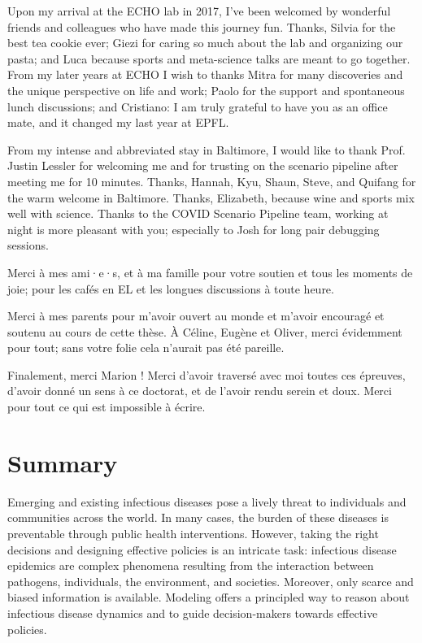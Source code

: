  Upon my arrival at the ECHO lab in 2017, I've been welcomed by wonderful friends and colleagues who have made this journey fun. Thanks, Silvia for the best tea cookie ever; Giezi for caring so much about the lab and organizing our pasta; and Luca because sports and meta-science talks are meant to go together. From my later years at ECHO I wish to thanks Mitra for many discoveries and the unique perspective on life and work; Paolo for the support and spontaneous lunch discussions; and Cristiano: I am truly grateful to have you as an office mate, and it changed my last year at EPFL.
 
  From my intense and abbreviated stay in Baltimore, I would like to thank Prof. Justin Lessler for welcoming me and for trusting on the scenario pipeline after meeting me for 10 minutes. Thanks, Hannah, Kyu, Shaun, Steve, and Quifang for the warm welcome in Baltimore. Thanks, Elizabeth, because wine and sports mix well with science. Thanks to the COVID Scenario Pipeline team, working at night is more pleasant with you; especially to Josh for long pair debugging sessions.
 
 Merci à mes ami·e·s, et à ma famille pour votre soutien et tous les moments de joie; pour les cafés en EL et les longues discussions à toute heure.

Merci à mes parents pour m'avoir ouvert au monde et m'avoir encouragé et soutenu au cours de cette thèse.
À Céline, Eugène et Oliver, merci évidemment pour tout; sans votre folie cela n'aurait pas été pareille.

Finalement, merci Marion ! Merci d'avoir traversé avec moi toutes ces épreuves, d'avoir donné un sens à ce doctorat, et de l'avoir rendu  serein et doux. Merci pour tout ce qui est impossible à écrire.

 
 \chapter*{Summary} %
\vspace{-.5cm}
Emerging and existing infectious diseases pose a lively threat to individuals and communities across the world. In many cases, the burden of these diseases is preventable through public health interventions. However, taking the right decisions and designing effective policies is an intricate task: infectious disease epidemics are complex phenomena resulting from the interaction between pathogens, individuals, the environment, and societies. Moreover, only scarce and biased information is available. Modeling offers a principled way to reason about infectious disease dynamics and to guide decision-makers towards effective policies. 

